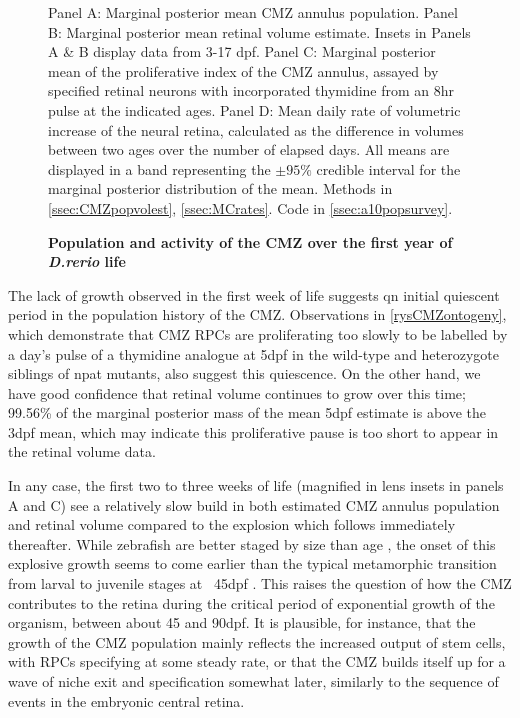 \begin{figure}[!h]
    \caption{{\bf Population and activity of the CMZ over the first year of \textit{D.rerio} life}}
    Panel A: Marginal posterior mean CMZ annulus population. Panel B: Marginal posterior mean retinal volume estimate. Insets in Panels A \& B display data from 3-17 dpf. Panel C: Marginal posterior mean of the proliferative index of the CMZ annulus, assayed by specified retinal neurons with incorporated thymidine from an 8hr pulse at the indicated ages. Panel D: Mean daily rate of volumetric increase of the neural retina, calculated as the difference in volumes between two ages over the number of elapsed days. All means are displayed in a band representing the $\pm 95 \%$ credible interval for the marginal posterior distribution of the mean.
    \label{CMZoverall}
    Methods in \autoref{ssec:CMZpopvolest}, \autoref{ssec:MCrates}.
    Code in \autoref{ssec:a10popsurvey}.
\end{figure}

The lack of growth observed in the first week of life suggests qn initial quiescent period in the population history of the CMZ. Observations in \autoref{rysCMZontogeny}, which demonstrate that CMZ RPCs are proliferating too slowly to be labelled by a day's pulse of a thymidine analogue at 5dpf in the wild-type and heterozygote siblings of npat mutants, also suggest this quiescence. On the other hand, we have good confidence that retinal volume continues to grow over this time; 99.56\% of the marginal posterior mass of the mean 5dpf estimate is above the 3dpf mean, which may indicate this proliferative pause is too short to appear in the retinal volume data.

In any case, the first two to three weeks of life (magnified in lens insets in panels A and C) see a relatively slow build in both estimated CMZ annulus population and retinal volume compared to the explosion which follows immediately thereafter. While zebrafish are better staged by size than age \cite{Parichy2009}, the onset of this explosive growth seems to come earlier than the typical metamorphic transition from larval to juvenile stages at ~45dpf \cite{Singleman2014}. This raises the question of how the CMZ contributes to the retina during the critical period of exponential growth of the organism, between about 45 and 90dpf. It is plausible, for instance, that the growth of the CMZ population mainly reflects the increased output of stem cells, with RPCs specifying at some steady rate, or that the CMZ builds itself up for a wave of niche exit and specification somewhat later, similarly to the sequence of events in the embryonic central retina.

